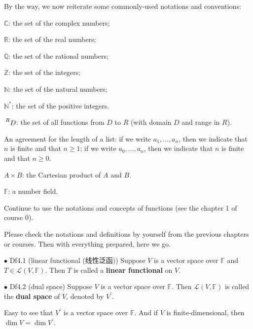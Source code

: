\documentclass{article}
\begin{document}
By the way, we now reiterate some commonly-used notations and conventions:
\begin{compactenum}
    \item $\mathbb{C}$: the set of the complex numbers;
    \item $\mathbb{R}$: the set of the real numbers;
    \item $\mathbb{Q}$: the set of the rational numbers;
    \item $\mathbb{Z}$: the set of the integers;
    \item $\mathbb{N}$: the set of the natural numbers;
    \item $\mathbb{N^\ast}$: the set of the positive integers.
    \item $\sideset{^R}{}{\mathop{D}}$: the set of all functions from $D$ to $R$ (with domain $D$ and range in $R$).
    \item An agreement for the length of a list: if we write $a_1, \dots, a_n$, then we indicate that $n$ is finite and that $n\geq 1$; if we write $a_0, \dots, a_n$, then we indicate that $n$ is finite and that $n\geq 0$.
    \item $A\times B$: the Cartesian product of $A$ and $B$.
    \item $\mathbb{F}$: a number field.
    \item Continue to use the notations and concepts of functions (see the chapter 1 of course 0).
\end{compactenum} 
Please check the notations and definitions by yourself from the previous chapters or courses. Then with everything prepared, here we go.

\begin{Df}{$\bullet$ Df4.1 (linear functional (线性泛函))}
    Suppose $V$ is a vector space over $\mathbb{F}$ and $T\in\mathcal{L}(V, \mathbb{F})$. Then $T$ is called a \textbf{linear functional} on $V$.
\end{Df}

\begin{Df}{$\bullet$ Df4.2 (dual space)}
    Suppose $V$ is a vector space over $\mathbb{F}$. Then $\mathcal{L}(V, \mathbb{F})$ is called the \textbf{dual space} of $V$, denoted by $V^\prime$.
\end{Df}

\begin{Rmk}{}
    Easy to see that \textcolor{Th}{$V^\prime$ is a vector space over $\mathbb{F}$. And if $V$ is finite-dimensional, then $\dim V = \dim V^\prime$.}
\end{Rmk}
\end{document}
